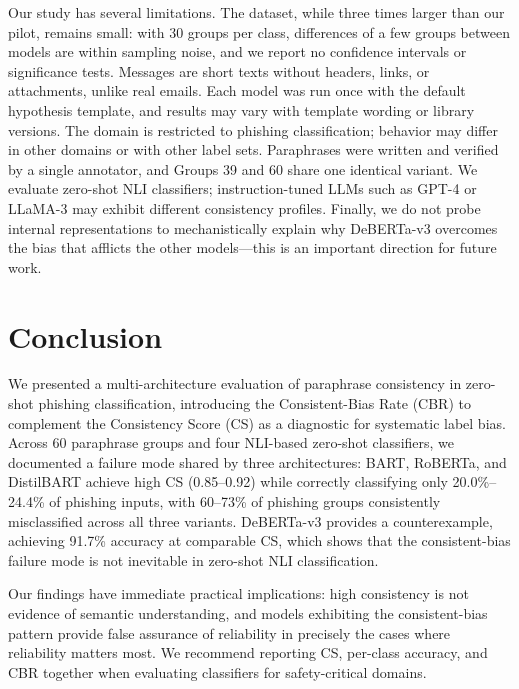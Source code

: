 \documentclass[11pt]{article}
\begin{document}
Our study has several limitations. The dataset, while three times larger than our pilot, remains small: with 30 groups per class, differences of a few groups between models are within sampling noise, and we report no confidence intervals or significance tests. Messages are short texts without headers, links, or attachments, unlike real emails. Each model was run once with the default hypothesis template, and results may vary with template wording or library versions. The domain is restricted to phishing classification; behavior may differ in other domains or with other label sets. Paraphrases were written and verified by a single annotator, and Groups 39 and 60 share one identical variant. We evaluate zero-shot NLI classifiers; instruction-tuned LLMs such as GPT-4 or LLaMA-3 \citep{touvron2023llama} may exhibit different consistency profiles. Finally, we do not probe internal representations to mechanistically explain why DeBERTa-v3 overcomes the bias that afflicts the other models---this is an important direction for future work.

\section{Conclusion}

We presented a multi-architecture evaluation of paraphrase consistency in zero-shot phishing classification, introducing the Consistent-Bias Rate (CBR) to complement the Consistency Score (CS) as a diagnostic for systematic label bias. Across 60 paraphrase groups and four NLI-based zero-shot classifiers, we documented a failure mode shared by three architectures: BART, RoBERTa, and DistilBART achieve high CS (0.85--0.92) while correctly classifying only 20.0\%--24.4\% of phishing inputs, with 60--73\% of phishing groups consistently misclassified across all three variants. DeBERTa-v3 provides a counterexample, achieving 91.7\% accuracy at comparable CS, which shows that the consistent-bias failure mode is not inevitable in zero-shot NLI classification.

Our findings have immediate practical implications: high consistency is not evidence of semantic understanding, and models exhibiting the consistent-bias pattern provide false assurance of reliability in precisely the cases where reliability matters most. We recommend reporting CS, per-class accuracy, and CBR together when evaluating classifiers for safety-critical domains.
\end{document}
